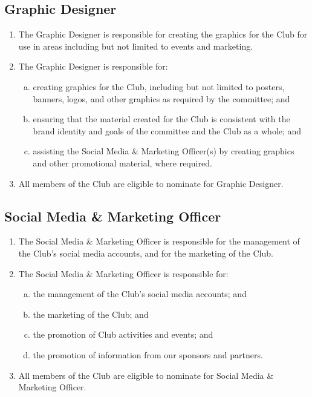\documentclass{schedule}
\begin{document}
\subsection{Graphic Designer}
\begin{enumerate}[(1)]
    \item The Graphic Designer is responsible for creating the graphics for the Club for use in areas including but not limited to events and marketing.
    \item The Graphic Designer is responsible for:
          \begin{enumerate}[(a)]
              \item creating graphics for the Club, including but not limited to posters, banners, logos, and other graphics as required by the committee; and
              \item ensuring that the material created for the Club is consistent with the brand identity and goals of the committee and the Club as a whole; and
              \item assisting the Social Media \& Marketing Officer(s) by creating graphics and other promotional material, where required.
          \end{enumerate}
    \item All members of the Club are eligible to nominate for Graphic Designer.
\end{enumerate}

\subsection{Social Media \& Marketing Officer}
\begin{enumerate}[(1)]
    \item The Social Media \& Marketing Officer is responsible for the management of the Club's social media accounts, and for the marketing of the Club.
    \item The Social Media \& Marketing Officer is responsible for:
          \begin{enumerate}[(a)]
              \item the management of the Club's social media accounts; and
              \item the marketing of the Club; and
              \item the promotion of Club activities and events; and
              \item the promotion of information from our sponsors and partners.
          \end{enumerate}
    \item All members of the Club are eligible to nominate for Social Media \& Marketing Officer.
\end{enumerate}
\end{document}
